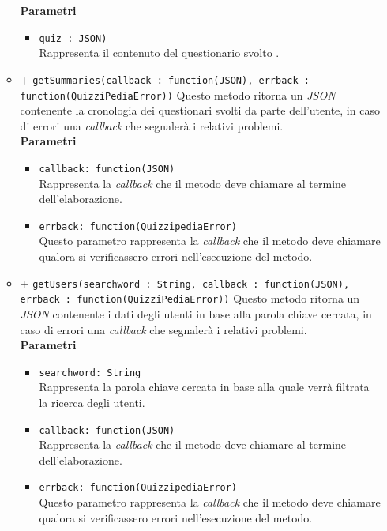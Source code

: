 \begin{itemize}
\begin{itemize}
		\textbf{Parametri} 
			\begin{itemize}
			\item	
				\texttt{quiz : JSON)} \\
				Rappresenta il contenuto del questionario svolto .		
			\end{itemize}
		\item	
		+ \texttt{getSummaries(callback : function(JSON), errback : function(QuizziPediaError))}	
		Questo metodo ritorna un \textit{JSON} contenente la cronologia dei questionari svolti da parte dell'utente, in caso di errori una \textit{callback} che segnalerà i relativi problemi.\\
		\textbf{Parametri} 
			\begin{itemize}
			\item	
				\texttt{callback: function(JSON)} \\
				Rappresenta la \textit{callback} che il metodo deve chiamare al termine dell'elaborazione.	
			\item	
				\texttt{errback: function(QuizzipediaError)} \\
				Questo parametro rappresenta la \textit{callback} che il metodo deve chiamare qualora si verificassero errori nell'esecuzione del metodo.
			\end{itemize}	
		\item			
		+ \texttt{getUsers(searchword : String, callback : function(JSON), errback : function(QuizziPediaError))}		
		Questo metodo ritorna un \textit{JSON} contenente i dati degli utenti in base alla parola chiave cercata, in caso di errori una \textit{callback} che segnalerà i relativi problemi.\\
		\textbf{Parametri} 
			\begin{itemize}
			\item	
				\texttt{searchword: String} \\
				Rappresenta la parola chiave cercata in base alla quale verrà filtrata la ricerca degli utenti.	
			\item	
				\texttt{callback: function(JSON)} \\
				Rappresenta la \textit{callback} che il metodo deve chiamare al termine dell'elaborazione.	
			\item	
				\texttt{errback: function(QuizzipediaError)} \\
				Questo parametro rappresenta la \textit{callback} che il metodo deve chiamare qualora si verificassero errori nell'esecuzione del metodo.		
			\end{itemize}
		\end{itemize}	
\end{itemize}